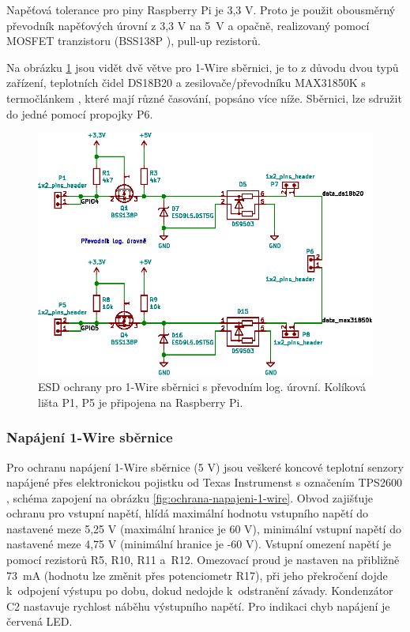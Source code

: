 Napěťová tolerance pro piny Raspberry Pi je 3,3 V. Proto je použit obousměrný převodník napěťových úrovní z 3,3 V na 5~V a opačně, realizovaný pomocí MOSFET tranzistoru (BSS138P \cite{bss138p}), pull-up rezistorů.

Na obrázku \ref{fig:ochrany-1-wire} jsou vidět dvě větve pro 1-Wire sběrnici, je to z důvodu dvou typů zařízení, teplotních čidel DS18B20 a zesilovače/převodníku MAX31850K \cite{max31850k} s termočlánkem , které mají různé časování, popsáno více níže. Sběrnici, lze sdružit do jedné pomocí propojky P6.

\begin{figure}[H]
    \centering
    \includegraphics[width=\textwidth]{images/svg/kicad/ochrany-1-wire.eps}
    \caption[ESD ochrany pro 1-Wire sběrnici s~převodníkem log. úrovní.]{ESD ochrany pro 1-Wire sběrnici s převodním log. úrovní. Kolíková lišta P1, P5 je připojena na Raspberry Pi.}
    \label{fig:ochrany-1-wire}
\end{figure}


\subsubsection{Napájení 1-Wire sběrnice}
\label{sec:napajeni-1-wire-sbernice}
Pro ochranu napájení 1-Wire sběrnice (5 V) jsou veškeré koncové teplotní senzory napájené přes elektronickou pojistku od Texas Instrumenst s označením TPS2600 \cite{tps26600}, schéma zapojení na obrázku \ref{fig:ochrana-napajeni-1-wire}. Obvod zajišťuje ochranu pro vstupní napětí, hlídá maximální hodnotu vstupního napětí do nastavené meze 5,25 V (maximální hranice je 60 V), minimální vstupní napětí do nastavené meze 4,75 V (minimální hranice je -60 V). Vstupní omezení napětí je pomocí rezistorů R5, R10, R11 a~R12. Omezovací proud je nastaven na přibližně 73~mA (hodnotu lze změnit přes potenciometr R17), při jeho překročení dojde k~odpojení výstupu po dobu, dokud nedojde k~odstranění závady. Kondenzátor C2 nastavuje rychlost náběhu výstupního napětí. Pro indikaci chyb napájení je červená LED.

